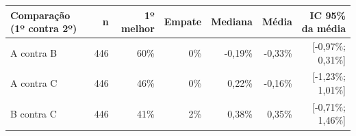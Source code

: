 \begin{tabular}{lrrrrrr}
\toprule
Comparação (1º contra 2º) & n & 1º melhor & Empate & Mediana & Média & IC 95\% da média \\
\midrule
A contra B & 446 & 60\% & 0\% & -0,19\% & -0,33\% & [-0,97\%; 0,31\%] \\
A contra C & 446 & 46\% & 0\% & 0,22\% & -0,16\% & [-1,23\%; 1,01\%] \\
B contra C & 446 & 41\% & 2\% & 0,38\% & 0,35\% & [-0,71\%; 1,46\%] \\
\bottomrule
\end{tabular}
